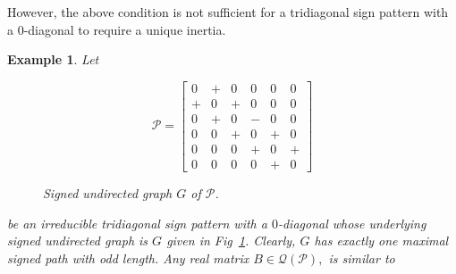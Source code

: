 \documentclass[a4paper, 10pt]{article}
\newtheorem{eg}{Example}[section]
\numberwithin{equation}{section}
\begin{document}
	However, the above condition is not sufficient for a tridiagonal sign pattern with a $0$-diagonal to require a unique inertia. 
	\begin{eg} \label{neg11}
		Let       
		\begin{figure}[H]
			\centering
			\begin{minipage}{.45\textwidth}
				\vspace{-1cm}
				\[
				\mathcal{P}=\begin{bmatrix}
					0 & + & 0 & 0 & 0 & 0 \\
					+ & 0 & + & 0 & 0 & 0 \\
					0 & + & 0 & - & 0 & 0 \\
					0 & 0 & + & 0 & + & 0 \\
					0 & 0 & 0 & + & 0 & + \\
					0 & 0 & 0 & 0 & + & 0
				\end{bmatrix}
				\]
			\end{minipage}
			\hspace{0.05\textwidth}
			\begin{minipage}{.45\textwidth}
				\centering
				\tikzset{node distance=1cm}
				\caption{Signed undirected graph $ G$ of $\mathcal{P}$.}
				\label{xnfig11}
			\end{minipage}
		\end{figure}
	be an irreducible tridiagonal sign pattern with a $0$-diagonal whose underlying signed undirected graph is $G$ given in Fig~\ref{xnfig11}. Clearly, $G$ has exactly one maximal signed path with odd length. Any real matrix $B\in \mathcal{Q}(\mathcal{P}),$ is similar to
	

\end{eg}
\end{document}
